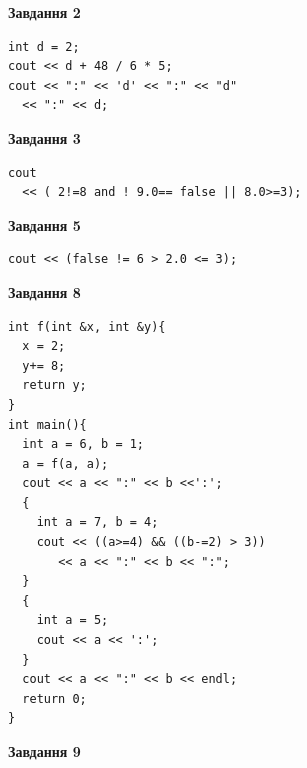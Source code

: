 \documentclass[12pt, ukrainian]{article}
\begin{document}
{\begin {large}
\begin{minipage}[t]{7.0cm}
\end{minipage}
\vline \hspace{1mm}
\begin{minipage}[t]{11.0cm}

\begin{center}
\textbf{Завдання 2}
\end{center}
\vspace{-8mm}

\begin{verbatim}
int d = 2;
cout << d + 48 / 6 * 5;
cout << ":" << 'd' << ":" << "d" 
  << ":" << d;
\end{verbatim}



\begin{center}
\textbf{Завдання 3}
\end{center}
\vspace{-8mm}

\begin{verbatim}
cout 
  << ( 2!=8 and ! 9.0== false || 8.0>=3);
\end{verbatim}



\begin{center}
\textbf{Завдання 5}
\end{center}
\vspace{-8mm}

\begin{verbatim}
cout << (false != 6 > 2.0 <= 3);
\end{verbatim}



\begin{center}
\textbf{Завдання 8}
\end{center}
\vspace{-8mm}

\begin{verbatim}
int f(int &x, int &y){
  x = 2;
  y+= 8;
  return y;
}
int main(){
  int a = 6, b = 1;
  a = f(a, a);
  cout << a << ":" << b <<':';
  {
    int a = 7, b = 4;
    cout << ((a>=4) && ((b-=2) > 3))
       << a << ":" << b << ":";
  }
  {
    int a = 5;
    cout << a << ':';
  }
  cout << a << ":" << b << endl;
  return 0;
}
\end{verbatim}

\end{minipage}


\begin{minipage}[t]{7.0cm}

\begin{center}
\textbf{Завдання 9}
\end{center}
\vspace{-8mm}


\end{minipage}
\end{large}}
\end{document}

